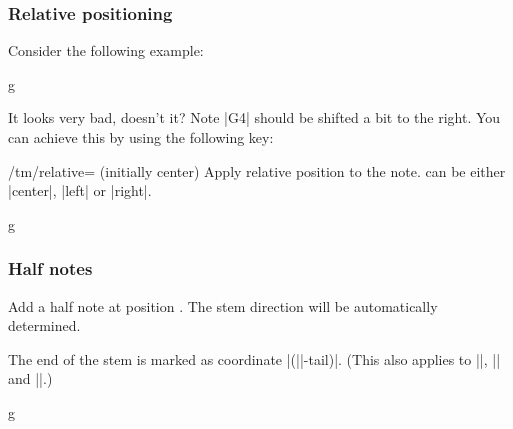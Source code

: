 \subsubsection{Relative positioning}\label{sec:music-notes:commands:relative}
Consider the following example:
\begin{codeexample}[]
\begin{tmline}
\begin{tmstaff}{g}{}
\end{tmstaff}
\end{tmline}
\end{codeexample}
It looks very bad, doesn't it? Note |G4| should be shifted a bit to the right. 
You can achieve this by using the following key:
\begin{key}{/tm/relative= (initially center)}
  Apply relative position to the note.  can be either 
  |center|, |left| or |right|.
\end{key}
\begin{codeexample}[]
\begin{tmline}
\begin{tmstaff}{g}{}
\end{tmstaff}
\end{tmline}
\end{codeexample}
\subsubsection{Half notes}\label{sec:music-notes:commands:half}
\begin{command}{\tmhalf{}}
  Add a half note at position . The stem direction will be automatically 
  determined.
\end{command}
The end of the stem is marked as coordinate |(||-tail)|. (This also 
applies to |\tmquarter|, |\tmeighth| and |\tmmorethaneighth|.)
\begin{codeexample}[]
\begin{tmline}%
\begin{tmstaff}{g}{}
        
     
\end{tmstaff}%
\end{tmline}
\end{codeexample}

